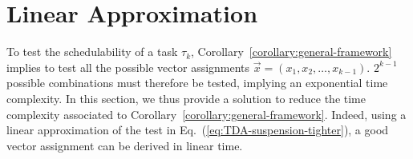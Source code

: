 \section{Linear Approximation}
\label{sec:linear-approximation}

To test the schedulability of a task $\tau_k$,
Corollary~\ref{corollary:general-framework} implies to test all the
possible vector assignments $\vec{x} = (x_1, x_2, \ldots, x_{k-1})$. $2^{k-1}$ possible combinations must therefore be tested, implying an exponential time complexity. In this section, we thus provide a solution to reduce the time complexity associated to
Corollary~\ref{corollary:general-framework}. Indeed, using a linear approximation of the test in Eq.~(\ref{eq:TDA-suspension-tighter}), a good vector assignment can be derived in linear time. 

